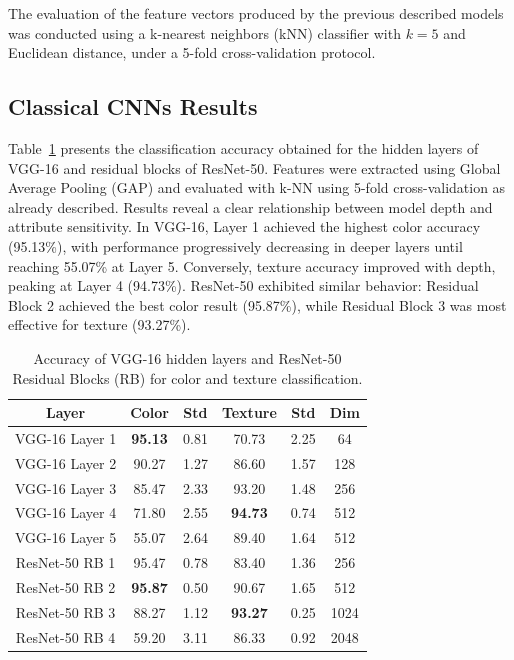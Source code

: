 \documentclass[conference]{IEEEtran}
\begin{document}
The evaluation of the feature vectors produced by the previous described models was conducted using a k-nearest neighbors (kNN) classifier with $k=5$ and Euclidean distance, under a 5-fold cross-validation protocol.


\subsection{Classical CNNs Results}

Table~\ref{tab2} presents the classification accuracy obtained for the hidden layers of VGG-16 and residual blocks of ResNet-50. Features were extracted using Global Average Pooling (GAP) and evaluated with k-NN using 5-fold cross-validation as already described. Results reveal a clear relationship between model depth and attribute sensitivity. In VGG-16, Layer 1 achieved the highest color accuracy (95.13\%), with performance progressively decreasing in deeper layers until reaching 55.07\% at Layer 5. Conversely, texture accuracy improved with depth, peaking at Layer 4 (94.73\%). ResNet-50 exhibited similar behavior: Residual Block 2 achieved the best color result (95.87\%), while Residual Block 3 was most effective for texture (93.27\%).

\begin{table}[htbp]
\caption{Accuracy of VGG-16 hidden layers and ResNet-50 Residual Blocks (RB) for color and texture classification.}
\begin{center}
\begin{tabular}{c|c|c|c|c|c}
\hline
\textbf{Layer} & \textbf{Color} & \textbf{Std} & \textbf{Texture} & \textbf{Std} & \textbf{Dim}\\
\hline
VGG-16 Layer 1 & \textbf{95.13} & 0.81 & 70.73 & 2.25 & 64 \\
VGG-16 Layer 2 & 90.27 & 1.27 & 86.60 & 1.57 & 128 \\
VGG-16 Layer 3 & 85.47 & 2.33 & 93.20 & 1.48 & 256 \\
VGG-16 Layer 4 & 71.80 & 2.55 & \textbf{94.73} & 0.74 & 512 \\
VGG-16 Layer 5 & 55.07 & 2.64 & 89.40 & 1.64 & 512 \\
ResNet-50 RB 1 & 95.47 & 0.78 & 83.40 & 1.36 & 256 \\
ResNet-50 RB 2 & \textbf{95.87} & 0.50 & 90.67 & 1.65 & 512 \\
ResNet-50 RB 3 & 88.27 & 1.12 & \textbf{93.27} & 0.25 & 1024 \\
ResNet-50 RB 4 & 59.20 & 3.11 & 86.33 & 0.92 & 2048 \\
\hline
\end{tabular}
\label{tab2}
\end{center}
\end{table}
\end{document}

